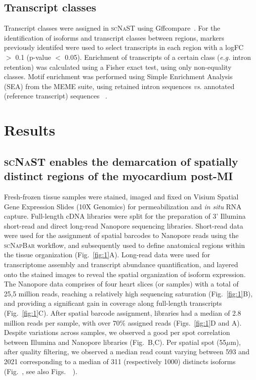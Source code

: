 \documentclass[utf8]{FrontiersinHarvard} %
\newcommand{\insi}{\textit{in situ}\xspace}
\newcommand{\eg}{\textit{e.g.}\xspace}
\newcommand{\vs}{\textit{vs.}\xspace}
\newcommand{\scn}{\textsc{scNapBar}\xspace}
\newcommand{\scnast}{\textsc{scNaST}\xspace}
\begin{document}
\subsection*{Transcript classes}
Transcript classes were assigned in \scnast using Gffcompare~\citep{Pertea2020:gff}.
For the identification of isoforms and transcript classes between regions, markers previously identifed were used to select transcripts in each region with a logFC $>$ 0.1 (p-value $<$ 0.05).
Enrichment of transcripts of a certain class (\eg intron retention) was calculated using a Fisher exact test, using only non-equality classes.
Motif enrichment was performed using Simple Enrichment Analysis (SEA) from the MEME suite, using retained intron sequences \vs annotated (reference transcript) sequences ~\citep{Bailey2015:MEME}.


\section*{Results}

\subsection*{\scnast enables the demarcation of spatially distinct regions of the myocardium post-MI}
Fresh-frozen tissue samples were stained, imaged and fixed on Visium Spatial Gene Expression Slides (10X Genomics) for permeabilization and \insi RNA capture.
Full-length cDNA libraries were split for the preparation of 3' Illumina short-read and direct long-read Nanopore sequencing libraries.
Short-read data were used for the assignment of spatial barcodes to Nanopore reads using the \scn workflow, and subsequently used to define anatomical regions within the tissue organization (Fig.~\ref{fig:1}A).
Long-read data were used for transcriptome assembly and transcript abundance quantification, and layered onto the stained images to reveal the spatial organization of isoform expression.
The Nanopore data comprises of four heart slices (or samples) with a total of 25,5 million reads, reaching a relatively high sequencing saturation (Fig.~\ref{fig:1}B), and providing a significant gain in coverage along full-length transcripts (Fig.~\ref{fig:1}C).
After spatial barcode assignment, libraries had a median of 2.8 million reads per sample, with over 70\% assigned reads (Figs.~\ref{fig:1}D and A).
Despite variations across samples, we observed a good per spot correlation between Illumina and Nanopore libraries (Fig.~B,C).
Per spatial spot (55$\mu$m), after quality filtering, we observed a median read count varying between 593 and 2021 corresponding to a median of 311 (respectively 1000) distincts isoforms (Fig.~, see also Figs.~~).
\end{document}
